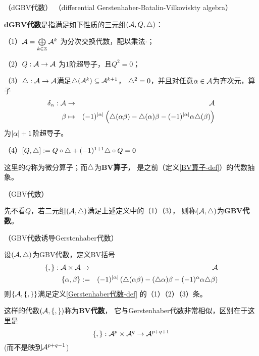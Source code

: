 \begin{definition}（dGBV代数）
（differential Gerstenhaber-Batalin-Vilkoviskty algebra）

\textbf{dGBV代数}是指满足如下性质的三元组$(\mathcal{A},Q,\triangle)$：

（1）$\mathcal{A}=\bigoplus\limits_{k\in\mathbb{Z}}\mathcal{A}^k$
为分次交换代数，配以乘法$\cdot$；

（2）$Q:\mathcal{A}\to\mathcal{A}$ 为$1$阶超导子，且$Q^2=0$；

（3）$\triangle:\mathcal{A}\to\mathcal{A}$满足$\triangle(\mathcal{A}^k)\subseteq\mathcal{A}^{k+1}$，
$\triangle^2=0$，并且对任意$\alpha\in\mathcal{A}$为齐次元，算子
\begin{eqnarray*}
\delta_\alpha:\mathcal{A}&\to&\mathcal{A}\\
\beta&\mapsto&
  (-1)^{|\alpha|}
  \left(
    \triangle(\alpha\beta)-\triangle(\alpha)\beta-(-1)^{|\alpha|}\alpha\triangle(\beta)
  \right)
\end{eqnarray*}
为$|\alpha|+1$阶超导子。

（4）$[Q,\triangle]:=Q\circ\triangle+(-1)^{1+1}\triangle\circ Q=0$
\label{dGBV代数-def}
\end{definition}

这里的$Q$称为微分算子；而$\triangle$为\textbf{BV算子}，
是之前（定义\ref{BV算子-def}）的代数抽象。

\begin{rem}（GBV代数）

先不看$Q$，若二元组$(\mathcal{A},\triangle)$满足上述定义中的（1）（3），
则称$(\mathcal{A},\triangle)$为\textbf{GBV代数}。
\end{rem}

\begin{thm}（GBV代数诱导Gerstenhaber代数）

设$(\mathcal{A},\triangle)$为GBV代数，定义BV括号
\begin{eqnarray*}
\{,\}:\mathcal{A}\times\mathcal{A} &\to& \mathcal{A}\\
\{\alpha,\beta\}&:=&
(-1)^{|\alpha|}
\left(
\triangle(\alpha\beta)-(\triangle\alpha)\beta-(-1)^\alpha\alpha\triangle\beta
\right)
\end{eqnarray*}
则$\{\mathcal{A},\{,\}\}$满足定义\ref{Gerstenhaber代数-def}
的（1）（2）（3）条。
\label{GBV诱导Gerstenhaber-thm}
\end{thm}

这样的代数$(\mathcal{A},\{,\})$称为\textbf{BV代数}，
它与Gerstenhaber代数非常相似，区别在于这里是
$$\{,\}:\mathcal{A}^p\times\mathcal{A}^q\to\mathcal{A}^{p+q+1}$$
(而不是映到$\mathcal{A}^{p+q-1}$)

